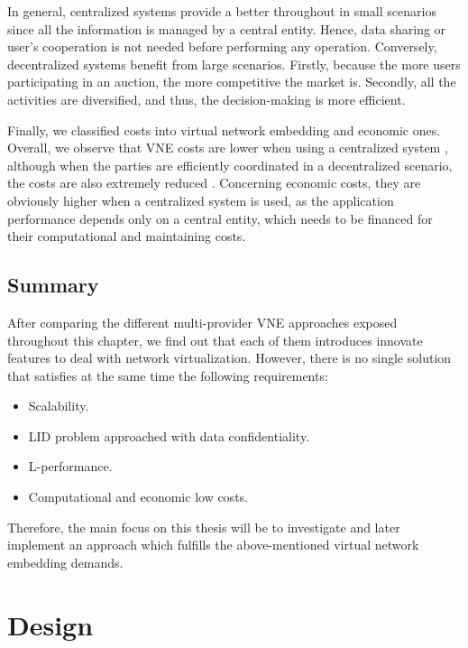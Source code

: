 In general, centralized systems provide a better throughout in small scenarios since all the information is managed by a central entity. Hence, data sharing or user's cooperation is not needed before performing any operation. Conversely, decentralized systems benefit from large scenarios. Firstly, because the more users participating in an auction, the more competitive the market is. Secondly, all the activities are diversified, and thus, the decision-making is more efficient. 

Finally, we classified costs into virtual network embedding and economic ones. Overall, we observe that VNE costs are lower when using a centralized system \citep{dietrich2015multi}, although when the parties are efficiently coordinated in a decentralized scenario, the costs are also extremely reduced \citep{chowdhury2010polyvine}. Concerning economic costs, they are obviously higher when a centralized system is used, as the application performance depends only on a central entity, which needs to be financed for their computational and maintaining costs.

\section{Summary}

After comparing the different multi-provider VNE approaches exposed throughout this chapter, we find out that each of them introduces innovate features to deal with network virtualization. However, there is no single solution that satisfies at the same time the following requirements:

\begin{itemize}
	\item Scalability.
	\item LID problem approached with data confidentiality.
	\item L-performance.
	\item Computational and economic low costs.
\end{itemize}

Therefore, the main focus on this thesis will be to investigate and later implement an approach which fulfills the above-mentioned virtual network embedding demands.


\chapter{Design}
\label{ch:design}

